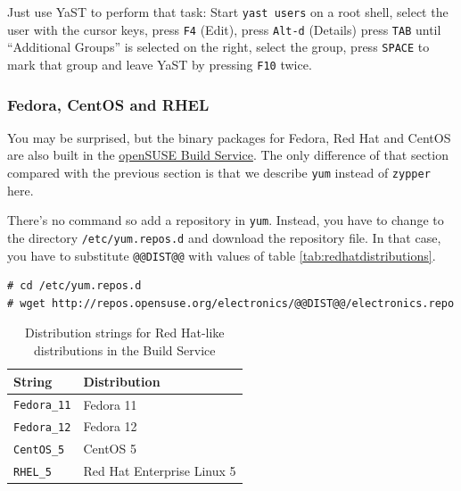 \documentclass[bibtotoc,UKenglish,halfparskip,oneside,DIV12]{scrreprt}
\begin{document}
Just use YaST to perform that task: Start \texttt{yast users} on a root shell, select the user with
the cursor keys, press \texttt{F4} (Edit), press \texttt{Alt-d} (Details) press \texttt{TAB} until
``Additional Groups'' is selected on the right, select the group, press \texttt{SPACE} to mark that
group and leave YaST by pressing \texttt{F10} twice.

\subsubsection{Fedora, CentOS and RHEL}

You may be surprised, but the binary packages for Fedora, Red Hat and CentOS are also built in the
\href{https://build.opensuse.org/}{openSUSE Build Service}. The only difference of that section
compared with the previous section is that we describe \texttt{yum} instead of \texttt{zypper} here.

There's no command so add a repository in \texttt{yum}. Instead, you have to change to the directory
\texttt{/etc/yum.repos.d} and download the repository file. In that case, you have to substitute
\texttt{@@DIST@@} with values of table \vref{tab:redhatdistributions}.

\begin{lstlisting}[style=inline]
% su
# cd /etc/yum.repos.d
# wget http://repos.opensuse.org/electronics/@@DIST@@/electronics.repo
\end{lstlisting}

\begin{table}[htb]
  \centering
  \begin{tabular}{|p{4cm}p{10cm}|}
    \hline
    \textbf{String}                 & \textbf{Distribution}                               \\
    \hline
    \hline
    \texttt{Fedora\_11}             & Fedora 11                                           \\
    \texttt{Fedora\_12}             & Fedora 12                                           \\
    \texttt{CentOS\_5}              & CentOS 5                                            \\
    \texttt{RHEL\_5}                & Red Hat Enterprise Linux 5                          \\
    \hline
  \end{tabular}
  \caption{Distribution strings for Red Hat-like distributions in the Build Service}
  \label{tab:redhatdistributions}
\end{table}
\end{document}
